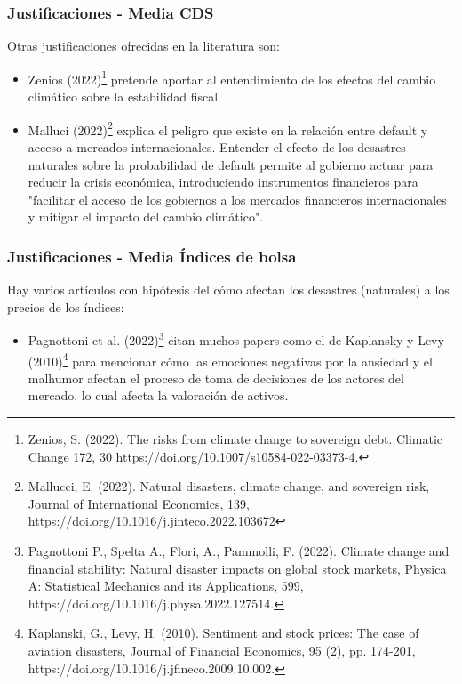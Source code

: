 \documentclass{beamer}
\begin{document}
\begin{frame}
\frametitle{Justificaciones - Media CDS}
Otras justificaciones ofrecidas en la literatura son:
\begin{itemize}
    \item Zenios (2022)\footnote{Zenios, S. (2022). The risks from climate change to sovereign debt. Climatic Change 172, 30 https://doi.org/10.1007/s10584-022-03373-4. } pretende aportar al entendimiento de los efectos del cambio climático sobre la estabilidad fiscal
    \item Malluci (2022)\footnote{Mallucci, E. (2022). Natural disasters, climate change, and sovereign risk, Journal of International Economics, 139, https://doi.org/10.1016/j.jinteco.2022.103672} explica el peligro que existe en la relación entre default y acceso a mercados internacionales. Entender el efecto de los desastres naturales sobre la probabilidad de default permite al gobierno actuar para reducir la crisis económica, introduciendo instrumentos financieros para "facilitar el acceso de los gobiernos a los mercados financieros internacionales y mitigar el impacto del cambio climático".
\end{itemize}
\end{frame}

\begin{frame}
\frametitle{Justificaciones - Media Índices de bolsa}
Hay varios artículos con hipótesis del cómo afectan los desastres (naturales) a los precios de los índices:
\begin{itemize}
    \item Pagnottoni et al. (2022)\footnote{Pagnottoni P., Spelta A., Flori, A., Pammolli, F. (2022). Climate change and financial stability: Natural disaster impacts on global stock markets, Physica A: Statistical Mechanics and its Applications, 599,
https://doi.org/10.1016/j.physa.2022.127514.} citan muchos papers como el de Kaplansky y Levy (2010)\footnote{Kaplanski, G., Levy, H. (2010). Sentiment and stock prices: The case of aviation disasters, Journal of Financial Economics, 95 (2), pp. 174-201, https://doi.org/10.1016/j.jfineco.2009.10.002.} para mencionar cómo las emociones negativas por la ansiedad y el malhumor afectan el proceso de toma de decisiones de los actores del mercado, lo cual afecta la valoración de activos.
\end{itemize}
\end{frame}
\end{document}
